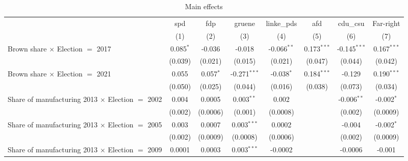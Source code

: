 \begin{table}[htbp]
   \caption{Main effects}
   \centering
   \begin{tabular}{lccccccc}
      \tabularnewline \midrule \midrule
                                                              & spd            & fdp            & gruene                 & linke\_pds     & afd            & cdu\_csu       & Far-right\\  
                                                              & (1)            & (2)            & (3)                    & (4)            & (5)            & (6)            & (7)\\  
      Brown share $\times$ Election $=$ 2017                  & 0.085$^{*}$    & -0.036         & -0.018                 & -0.066$^{**}$  & 0.173$^{***}$  & -0.145$^{***}$ & 0.167$^{***}$\\   
                                                              & (0.039)        & (0.021)        & (0.015)                & (0.021)        & (0.047)        & (0.044)        & (0.042)\\   
      Brown share $\times$ Election $=$ 2021                  & 0.055          & 0.057$^{*}$    & -0.271$^{***}$         & -0.038$^{*}$   & 0.184$^{***}$  & -0.129         & 0.190$^{***}$\\   
                                                              & (0.050)        & (0.025)        & (0.044)                & (0.016)        & (0.038)        & (0.073)        & (0.034)\\   
      Share of manufacturing 2013 $\times$ Election $=$ 2002  & 0.004          & 0.0005         & 0.003$^{**}$           & 0.002          &                & -0.006$^{**}$  & -0.002$^{*}$\\   
                                                              & (0.002)        & (0.0006)       & (0.001)                & (0.0008)       &                & (0.002)        & (0.0009)\\   
      Share of manufacturing 2013 $\times$ Election $=$ 2005  & 0.003          & 0.0007         & 0.003$^{***}$          & 0.0002         &                & -0.004         & -0.002$^{*}$\\   
                                                              & (0.002)        & (0.0009)       & (0.0008)               & (0.0006)       &                & (0.002)        & (0.0009)\\   
      Share of manufacturing 2013 $\times$ Election $=$ 2009  & 0.0001         & 0.0003         & 0.003$^{***}$          & -0.0002        &                & -0.0006        & -0.001\\   

\end{tabular}
\end{table}
